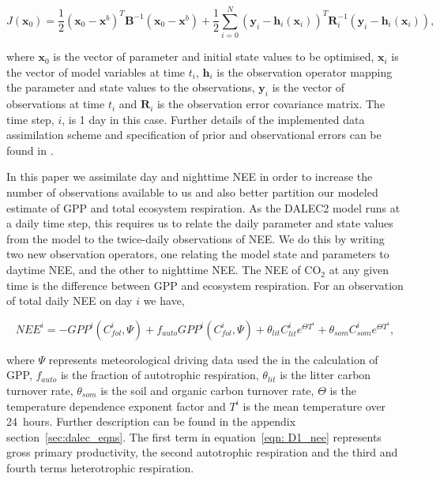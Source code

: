 \documentclass[draft,linenumbers]{agujournal}
\begin{document}
\begin{linenomath*}
\begin{equation}
J(\textbf{x}_0) = \frac{1}{2}(\textbf{x}_0-\textbf{x}^b)^{T}\textbf{B}^{-1}(\textbf{x}_0-\textbf{x}^b)+\frac{1}{2}\sum_{i=0}^{N}(\textbf{y}_i-\textbf{h}_i(\textbf{x}_i))^{T}\textbf{R}_{i}^{-1}(\textbf{y}_i-\textbf{h}_i(\textbf{x}_i)),
\end{equation}
\end{linenomath*}
where $\textbf{x}_{0}$ is the vector of parameter and initial state values to be optimised, $\textbf{x}_{i}$ is the vector of model variables at time \(t_{i}\), $\textbf{h}_{i}$ is the observation operator mapping the parameter and state values to the observations, $\textbf{y}_{i}$ is the vector of observations at time \(t_i\) and $\textbf{R}_{i}$ is the observation error covariance matrix. The time step, \(i\), is 1 day in this case. Further details of the implemented data assimilation scheme and specification of prior and observational errors can be found in \citet{Pinnington2016299}. 

In this paper we assimilate day and nighttime NEE in order to increase the number of observations available to us and also better partition our {\color{blue}modeled} estimate of GPP and total ecosystem respiration. As the DALEC2 model runs at a daily time step, this requires us to relate the daily parameter and state values from the model to the twice-daily observations of NEE. We do this by writing two new observation operators, one relating the model state and parameters to daytime NEE, and the other to nighttime NEE. The NEE of CO\(_{2}\) at any given time is the difference between GPP and ecosystem respiration. For an observation of total daily NEE on day \(i\) we have,
\begin{linenomath*}
\begin{equation}
NEE^{i}=-GPP^{i}(C_{fol}^{i}, \Psi) +f_{auto}GPP^{i}(C_{fol}^{i}, \Psi) + \theta_{lit}C_{lit}^i e^{\Theta T^{i}} + \theta_{som}C_{som}^i e^{\Theta T^{i}}, \label{eqn: D1_nee}
\end{equation}
\end{linenomath*}
where \(\Psi\) represents meteorological driving data used the in the calculation of GPP, \(f_{auto}\) is the fraction of autotrophic respiration, \(\theta_{lit}\) is the litter carbon turnover rate, \(\theta_{som}\) is the soil and organic carbon turnover rate, \(\Theta\) is the temperature dependence exponent factor and \(T^{i}\) is the mean temperature over 24~hours. Further description can be found in the appendix section~\ref{sec:dalec_eqns}. The first term in equation~\eqref{eqn: D1_nee} represents gross primary productivity, the second autotrophic respiration and the third and fourth terms heterotrophic respiration. 
\end{document}
